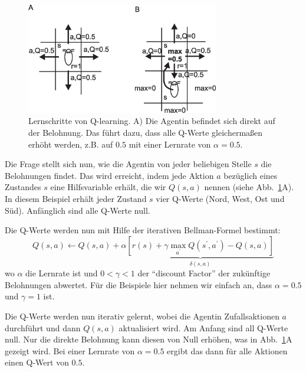 \documentclass[12pt]{report}
\begin{document}
\begin{figure}[!hbt]
\begin{center}
\mbox{\includegraphics[width=0.75\textwidth]{learning_steps}}
\end{center}
\caption{Lernschritte von Q-learning. A) Die Agentin befindet
  sich direkt auf der Belohnung. Das führt dazu, dass alle
  Q-Werte gleichermaßen erhöht werden, z.B. auf $0.5$ mit
  einer Lernrate von $\alpha = 0.5$.
\label{learning_steps}}
\end{figure}

Die Frage stellt sich nun, wie die Agentin von jeder beliebigen Stelle
$s$ die Belohnungen findet. Das wird erreicht, indem jede Aktion $a$
bezüglich eines Zustandes $s$ eine Hilfsvariable erh\"alt, die wir
$Q(s,a)$ nennen (siehe Abb.~\ref{learning_steps}A). In diesem
Beispiel erh\"alt jeder Zustand $s$ vier Q-Werte (Nord, West, Ost
und S\"ud). Anfänglich sind alle Q-Werte null.

Die Q-Werte werden nun mit Hilfe der iterativen Bellman-Formel bestimmt:
\begin{equation}
  Q(s,a) \leftarrow Q(s,a) + \alpha \underbrace{\left[ r(s) + \gamma \max_{a^\prime} Q(s^\prime,a^\prime) - Q(s,a) \right]}_{\delta(s,a)}
  \label{bellit}
\end{equation}
wo $\alpha$ die Lernrate ist und $0 < \gamma < 1$ der ``discount
Factor'' der zukünftige Belohnungen abwertet. F\"ur die Beispiele hier
nehmen wir einfach an, dass $\alpha = 0.5$ und $\gamma = 1$ ist.

Die Q-Werte werden nun iterativ gelernt, wobei die Agentin
Zufallsaktionen $a$ durchführt und dann $Q(s,a)$ aktualisiert wird.
Am Anfang sind all Q-Werte null. Nur die direkte Belohnung kann diesen
von Null erhöhen, was in Abb.~\ref{learning_steps}A gezeigt wird. Bei
einer Lernrate von $\alpha = 0.5$ ergibt das dann f\"ur alle Aktionen
einen Q-Wert von $0.5$.
\end{document}
